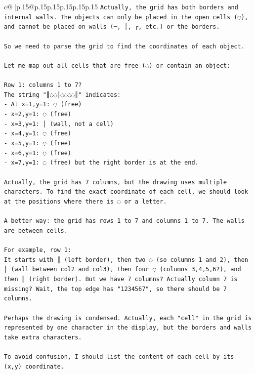 \documentclass{article}
\begin{document}
{\begin{supertabular}{c@{$\;$}|p{.15\linewidth}@{}p{.15\linewidth}p{.15\linewidth}p{.15\linewidth}p{.15\linewidth}p{.15\linewidth}}
{{{\texttt{Actually, the grid has both borders and internal walls. The objects can only be placed in the open cells (◌), and cannot be placed on walls (─, │, ┌, etc.) or the borders.} \\
\\ 
\texttt{So we need to parse the grid to find the coordinates of each object.} \\
\\ 
\texttt{Let me map out all cells that are free (◌) or contain an object:} \\
\\ 
\texttt{Row 1: columns 1 to 7?} \\
\texttt{The string "║◌◌│◌◌◌◌║" indicates:} \\
\texttt{{-} At x=1,y=1: ◌ (free)} \\
\texttt{{-} x=2,y=1: ◌ (free)} \\
\texttt{{-} x=3,y=1: │ (wall, not a cell)} \\
\texttt{{-} x=4,y=1: ◌ (free)} \\
\texttt{{-} x=5,y=1: ◌ (free)} \\
\texttt{{-} x=6,y=1: ◌ (free)} \\
\texttt{{-} x=7,y=1: ◌ (free) but the right border is at the end.} \\
\\ 
\texttt{Actually, the grid has 7 columns, but the drawing uses multiple characters. To find the exact coordinate of each cell, we should look at the positions where there is ◌ or a letter.} \\
\\ 
\texttt{A better way: the grid has rows 1 to 7 and columns 1 to 7. The walls are between cells.} \\
\\ 
\texttt{For example, row 1: } \\
\texttt{It starts with ║ (left border), then two ◌ (so columns 1 and 2), then │ (wall between col2 and col3), then four ◌ (columns 3,4,5,6?), and then ║ (right border). But we have 7 columns? Actually column 7 is missing? Wait, the top edge has "1234567", so there should be 7 columns.} \\
\\ 
\texttt{Perhaps the drawing is condensed. Actually, each "cell" in the grid is represented by one character in the display, but the borders and walls take extra characters.} \\
\\ 
\texttt{To avoid confusion, I should list the content of each cell by its (x,y) coordinate.} \\
}}}
\end{supertabular}}
\end{document}
